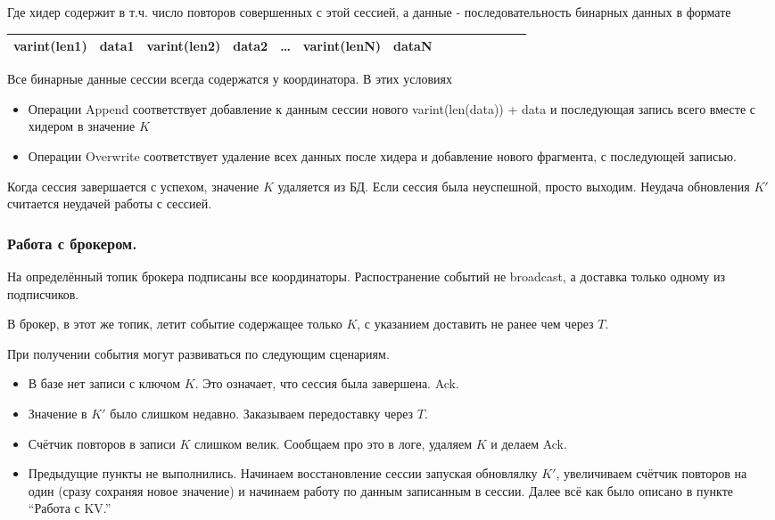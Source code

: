 \documentclass[a4paper,12pt]{article}
\begin{document}
Где хидер содержит в т.ч. число повторов совершенных с этой сессией, а данные - последовательность бинарных данных в формате

\begin{center}
\begin{tabular}{|Sl|Sc|Sc|Sc|Sc|Sc|Sr|}
    \hline
    varint(len1) & data1 & varint(len2) & data2 & \dots & varint(lenN) & dataN \\
    \hline
\end{tabular}
\end{center}

Все бинарные данные сессии всегда содержатся у координатора. В этих условиях

\begin{itemize}
\item Операции Append соответствует добавление к данным сессии нового varint(len(data)) + data и последующая запись всего вместе с
хидером в значение $K$
\item Операции Overwrite соответствует удаление всех данных после хидера и добавление нового фрагмента, с последующей записью.
\end{itemize}

Когда сессия завершается с успехом, значение $K$ удаляется из БД. Если сессия была неуспешной, просто выходим. Неудача обновления $K'$ считается
неудачей работы с сессией.

\subsubsection{Работа с брокером.}

На определённый топик брокера подписаны все координаторы. Распостранение событий не broadcast, а доставка только одному из подписчиков.

\smallskip
В брокер, в этот же топик, летит событие содержащее только $K$, с указанием доставить не ранее чем через $T$.

\smallskip
При получении события могут развиваться по следующим сценариям.

\begin{itemize}
\item В базе нет записи с ключом $K$. Это означает, что сессия была завершена. Ack.
\item Значение в $K'$ было слишком недавно. Заказываем передоставку через $T$.
\item Счётчик повторов в записи $K$ слишком велик. Сообщаем про это в логе, удаляем $K$ и делаем Ack.
\item Предыдущие пункты не выполнились. Начинаем восстановление сессии запуская обновлялку $K'$, увеличиваем счётчик повторов на один (сразу сохраняя
новое значение) и начинаем работу по данным записанным в сессии. Далее всё как было описано в пункте \enquote{Работа с KV.}
\end{itemize}
\end{document}
